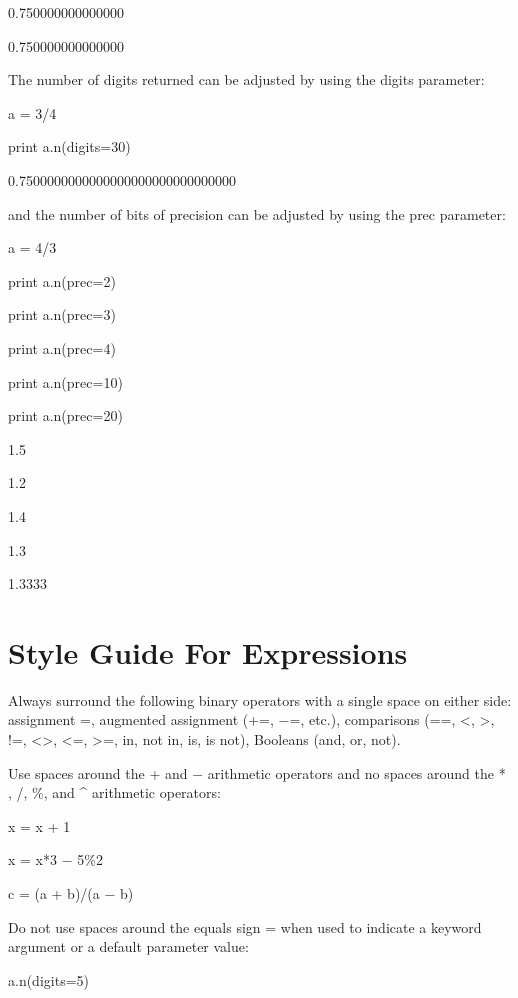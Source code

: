 \documentclass[12pt,twoside]{book}
\begin{document}
0.750000000000000

0.750000000000000

The number of digits returned can be adjusted by using the digits
parameter:


\bigskip

a = 3/4

print a.n(digits=30)

{\textbar}

0.7500000000000000000000000000000


\bigskip

and the number of bits of precision can be adjusted by using the prec
parameter:


\bigskip

a = 4/3

print a.n(prec=2)

print a.n(prec=3)

print a.n(prec=4)

print a.n(prec=10)

print a.n(prec=20)

{\textbar}

1.5

1.2

1.4

1.3

1.3333

\section[Style Guide For Expressions]{Style Guide For
Expressions}
Always surround the following binary operators with a single space on
either side: assignment {\textquotesingle}={\textquotesingle},
augmented assignment (+=, $-$=, etc.), comparisons (==, {\textless},
{\textgreater}, !=, {\textless}{\textgreater}, {\textless}=,
{\textgreater}=, in, not in, is, is not), Booleans (and, or, not).


\bigskip

Use spaces around the + and $-$ arithmetic operators and no spaces
around the * , /, \%, and \^{} arithmetic operators:

x = x + 1

x = x*3 $-$ 5\%2

c = (a + b)/(a $-$ b)


\bigskip

Do not use spaces around the equals sign
{\textquotesingle}={\textquotesingle} when used to indicate a keyword
argument or a default parameter value:

a.n(digits=5)
\end{document}
